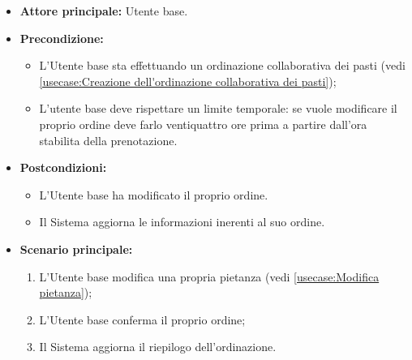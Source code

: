 \label{usecase:Modifica della propria ordinazione}
\begin{itemize}
	\item \textbf{Attore principale:} Utente base.

	\item \textbf{Precondizione:}
	      \begin{itemize}
		      \item L'Utente base sta effettuando un ordinazione collaborativa dei pasti (vedi \autoref{usecase:Creazione dell'ordinazione collaborativa dei pasti});
		      \item L'utente base deve rispettare un limite temporale: se vuole modificare il proprio ordine deve farlo ventiquattro ore prima a partire dall'ora stabilita della prenotazione.
	      \end{itemize}

	\item \textbf{Postcondizioni:}
	      \begin{itemize}
		      \item L'Utente base ha modificato il proprio ordine.
		      \item Il Sistema aggiorna le informazioni inerenti al suo ordine.
	      \end{itemize}

	\item \textbf{Scenario principale:}
	      \begin{enumerate}
		      \item L'Utente base modifica una propria pietanza (vedi \autoref{usecase:Modifica pietanza});
		      \item L'Utente base conferma il proprio ordine;
		      \item Il Sistema aggiorna il riepilogo dell'ordinazione.
	      \end{enumerate}
\end{itemize}

